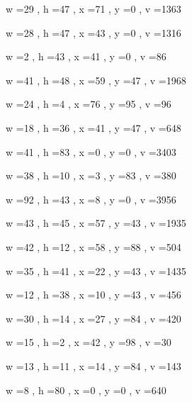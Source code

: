 \documentclass[11pt]{article}
\begin{document}
w =29 , h =47 , x =71 , y =0 , v =1363
\par
w =28 , h =47 , x =43 , y =0 , v =1316
\par
w =2 , h =43 , x =41 , y =0 , v =86
\par
w =41 , h =48 , x =59 , y =47 , v =1968
\par
w =24 , h =4 , x =76 , y =95 , v =96
\par
w =18 , h =36 , x =41 , y =47 , v =648
\par
w =41 , h =83 , x =0 , y =0 , v =3403
\par
w =38 , h =10 , x =3 , y =83 , v =380
\par
\newpage




w =92 , h =43 , x =8 , y =0 , v =3956
\par
w =43 , h =45 , x =57 , y =43 , v =1935
\par
w =42 , h =12 , x =58 , y =88 , v =504
\par
w =35 , h =41 , x =22 , y =43 , v =1435
\par
w =12 , h =38 , x =10 , y =43 , v =456
\par
w =30 , h =14 , x =27 , y =84 , v =420
\par
w =15 , h =2 , x =42 , y =98 , v =30
\par
w =13 , h =11 , x =14 , y =84 , v =143
\par
w =8 , h =80 , x =0 , y =0 , v =640
\par
\newpage
\end{document}
